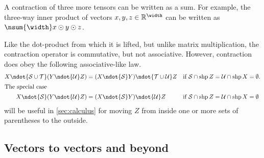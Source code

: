 A contraction of three more tensors can be written as a sum. For example, the three-way inner product of vectors $x, y, z \in \reals^{\width}$ can be written as $\nsum{\width} x \odot y \odot z$.

Like the dot-product from which it is lifted, but unlike matrix multiplication, the contraction operator is commutative, but not associative.
However, contraction does obey the following associative-like law.
\begin{align}
  X \ndot{\mathcal{S} \cup \mathcal{T}} (Y \ndot{\mathcal{U}} Z) &= (X \ndot{\mathcal{S}} Y) \ndot{\mathcal{T}\cup\mathcal{U}} Z && \text{if $\mathcal{S} \cap \shp Z = \mathcal{U} \cap \shp X = \emptyset$}. \label{eq:ndot_assoc2} \\
\intertext{The special case}  
  X \ndot{\mathcal{S}} (Y \ndot{\mathcal{U}} Z) &= (X \ndot{\mathcal{S}} Y) \ndot{\mathcal{U}} Z && \text{if $\mathcal{S} \cap \shp Z = \mathcal{U} \cap \shp X = \emptyset$} \label{eq:ndot_assoc}
\end{align}
will be useful in \cref{sec:calculus} for moving $Z$ from inside one or more sets of parentheses to the outside.

\subsection{Vectors to vectors and beyond}

